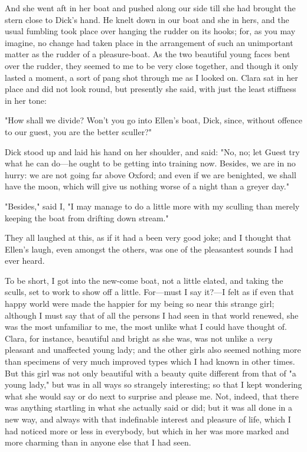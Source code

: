 And she went aft in her boat and pushed along our side till she had
brought the stern close to Dick's hand. He knelt down in our boat and
she in hers, and the usual fumbling took place over hanging the rudder
on its hooks; for, as you may imagine, no change had taken place in the
arrangement of such an unimportant matter as the rudder of a
pleasure-boat. As the two beautiful young faces bent over the rudder,
they seemed to me to be very close together, and though it only lasted a
moment, a sort of pang shot through me as I looked on. Clara sat in her
place and did not look round, but presently she said, with just the
least stiffness in her tone:

"How shall we divide? Won't you go into Ellen's boat, Dick, since,
without offence to our guest, you are the better sculler?"

Dick stood up and laid his hand on her shoulder, and said: "No, no; let
Guest try what he can do---he ought to be getting into training now.
Besides, we are in no hurry: we are not going far above Oxford; and even
if we are benighted, we shall have the moon, which will give us nothing
worse of a night than a greyer day."

"Besides," said I, "I may manage to do a little more with my sculling
than merely keeping the boat from drifting down stream."

They all laughed at this, as if it had a been very good joke; and I
thought that Ellen's laugh, even amongst the others, was one of the
pleasantest sounds I had ever heard.

To be short, I got into the new-come boat, not a little elated, and
taking the sculls, set to work to show off a little. For---must I say
it?---I felt as if even that happy world were made the happier for my
being so near this strange girl; although I must say that of all the
persons I had seen in that world renewed, she was the most unfamiliar to
me, the most unlike what I could have thought of. Clara, for instance,
beautiful and bright as she was, was not unlike a \emph{very} pleasant
and unaffected young lady; and the other girls also seemed nothing more
than specimens of very much improved types which I had known in other
times. But this girl was not only beautiful with a beauty quite
different from that of "a young lady," but was in all ways so strangely
interesting; so that I kept wondering what she would say or do next to
surprise and please me. Not, indeed, that there was anything startling
in what she actually said or did; but it was all done in a new way, and
always with that indefinable interest and pleasure of life, which I had
noticed more or less in everybody, but which in her was more marked and
more charming than in anyone else that I had seen.

